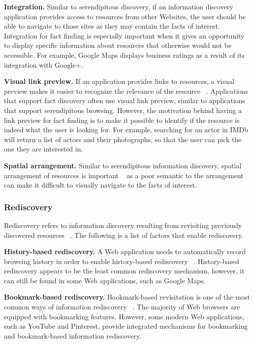 \documentclass{casconpaper}
\begin{document}
{{\textbf{Integration.} Similar to serendipitous discovery, if an information discovery application provides access to resources from other Websites, the user should be able to navigate to those sites as they may contain the facts of interest. Integration for fact finding is especially important when it gives an opportunity to display specific information about resources that otherwise would not be accessible. For example, Google Maps displays business ratings as a result of its integration with Google+.  

\textbf{Visual link preview.} If an application provides links to resources, a visual preview makes it easier to recognize the relevance of the resource ~\cite{abrams}. Applications that support fact discovery often use visual link preview, similar to applications that support serendipitous browsing. However, the motivation behind having a link preview for fact finding is to make it possible to identify if the resource is indeed what the user is looking for. For example, searching for an actor in IMDb will return a list of actors and their photographs, so that the user can pick the one they are interested in.

\textbf{Spatial arrangement.} Similar to serendipitous information discovery, spatial arrangement of resources is important ~\cite{abrams} as a poor semantic to the arrangement can make it difficult to visually navigate to the facts of interest.


} %

{\subsubsection{Rediscovery}
Rediscovery refers to information discovery resulting from revisiting previously discovered resources ~\cite{tauscher}. The following is a list of factors that enable rediscovery.

\textbf{History-based rediscovery.} A Web application needs to automatically record browsing history in order to enable history-based rediscovery ~\cite{tauscher}. History-based rediscovery appears to be the least common rediscovery mechanism, however, it can still be found in some Web applications, such as Google Maps.

\textbf{Bookmark-based rediscovery.} Bookmark-based revisitation is one of the most common ways of information rediscovery ~\cite{abrams}. The majority of Web browsers are equipped with bookmarking features. However, some modern Web applications, such as YouTube and Pinterest, provide integrated mechanisms for bookmarking and bookmark-based information rediscovery. 

}}
\end{document}
